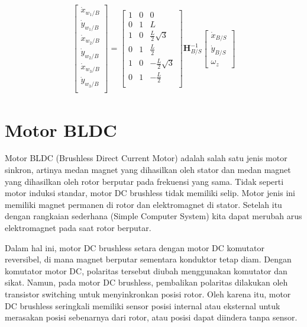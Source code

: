      \begin{eqnarray}
        \begin{bmatrix}
            \dot{x}_{{w_1/B}}\\
            \dot{y}_{{w_1/B}}\\
            \dot{x}_{{w_2/B}}\\
            \dot{y}_{{w_2/B}}\\
            \dot{x}_{{w_3/B}}\\
            \dot{y}_{{w_3/B}}\\
        \end{bmatrix}
        =
        \begin{bmatrix}
            1&0& 0\\
            0&1& L\\
            1&0&\frac{L}{2}\sqrt{3}\\
            0&1&\frac{L}{2}\\
            1&0&-\frac{L}{2}\sqrt{3}\\
            0&1&-\frac{L}{2}\\
        \end{bmatrix}
        \mathbf{H}_{B/S}^{-1}
        \begin{bmatrix}
            \dot{x}_{B/S}\\
            \dot{y}_{B/S}\\
            \omega_z
        \end{bmatrix}
    \end{eqnarray}
    
\section{Motor BLDC}
Motor BLDC (Brushless Direct Current Motor) adalah salah satu jenis motor sinkron, artinya medan magnet yang dihasilkan oleh stator dan medan magnet yang dihasilkan oleh rotor berputar pada frekuensi yang sama. Tidak seperti motor induksi standar, motor DC brushless tidak memiliki selip. Motor jenis ini memiliki magnet permanen di rotor dan elektromagnet di stator. Setelah itu dengan rangkaian sederhana (Simple Computer System) kita dapat merubah arus elektromagnet pada saat rotor berputar.

Dalam hal ini, motor DC brushless setara dengan motor DC komutator reversibel, di mana magnet berputar sementara konduktor tetap diam. Dengan komutator motor DC, polaritas tersebut diubah menggunakan komutator dan sikat. Namun, pada motor DC brushless, pembalikan polaritas dilakukan oleh transistor switching untuk menyinkronkan posisi rotor. Oleh karena itu, motor DC brushless seringkali memiliki sensor posisi internal atau eksternal untuk merasakan posisi sebenarnya dari rotor, atau posisi dapat diindera tanpa sensor. 
